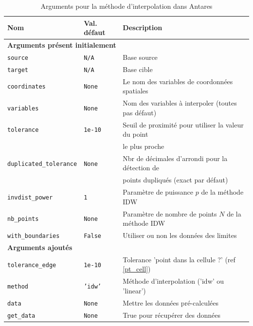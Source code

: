 \label{arguments}
\begin{table}[ht]
    \centering
    \begin{tabular}{|l|l|l|}
    \hline
    \textbf{Nom} & \textbf{Val. défaut} & \textbf{Description} \\ \hline %
    \multicolumn{3}{|l|}{\textbf{Arguments présent initialement}} \\ \hline
    \texttt{source} & \texttt{N/A} & Base source \\
    \texttt{target} & \texttt{N/A} & Base cible \\
    \texttt{coordinates} & \texttt{None} & Le nom des variables de coordonnées spatiales \\
    \texttt{variables} & \texttt{None} & Nom des variables à interpoler (toutes pas défaut) \\
    \texttt{tolerance} & \texttt{1e-10} & Seuil de proximité pour utiliser la valeur du point \\
    \texttt{\phantom{-}} & \texttt{\phantom{-}} &  le plus proche \\
    \texttt{duplicated\_tolerance} & \texttt{None} & Nbr de décimales d'arrondi pour la détection de \\
    \texttt{\phantom{-}} & \texttt{\phantom{-}} & points dupliqués (exact par défaut) \\
    \texttt{invdist\_power} & \texttt{1} & Paramètre de puissance \(p\) de la méthode IDW \\
    \texttt{nb\_points} & \texttt{None} & Paramètre de nombre de points \(N\) de la méthode IDW \\
    \texttt{with\_boundaries} & \texttt{False} & Utiliser ou non les données des limites \\ \hline
    \multicolumn{3}{|l|}{\textbf{Arguments ajoutés}} \\ \hline
    \texttt{tolerance\_edge} & \texttt{1e-10} & Tolerance 'point dans la cellule ?' (ref \ref{pt_cell})\\
    \texttt{method} & \texttt{'idw'} & Méthode d'interpolation ('idw' ou 'linear') \\
    \texttt{data} & \texttt{None} & Mettre les données pré-calculées \\
    \texttt{get\_data} & \texttt{None} & True pour récupérer des données \\ \hline
    \end{tabular}
    \caption{Arguments pour la méthode d'interpolation dans Antares}
    \label{tab:arguments_interpolation}
\end{table}

